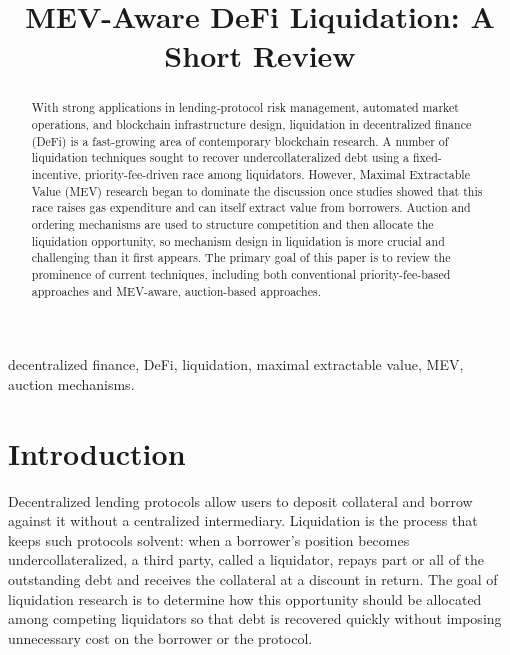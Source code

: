 \documentclass[conference]{IEEEtran}
\begin{document}
\title{MEV-Aware DeFi Liquidation: A Short Review}

\author{
}

\maketitle

\begin{abstract}
With strong applications in lending-protocol risk management, automated
market operations, and blockchain infrastructure design, liquidation in
decentralized finance (DeFi) is a fast-growing area of contemporary
blockchain research. A number of liquidation techniques sought to recover
undercollateralized debt using a fixed-incentive, priority-fee-driven
race among liquidators. However, Maximal Extractable Value (MEV)
research began to dominate the discussion once studies showed that this
race raises gas expenditure and can itself extract value from borrowers.
Auction and ordering mechanisms are used to structure competition and
then allocate the liquidation opportunity, so mechanism design in
liquidation is more crucial and challenging than it first appears. The
primary goal of this paper is to review the prominence of current
techniques, including both conventional priority-fee-based approaches
and MEV-aware, auction-based approaches.
\end{abstract}

\begin{IEEEkeywords}
decentralized finance, DeFi, liquidation, maximal extractable value, MEV, auction mechanisms.
\end{IEEEkeywords}

\section{Introduction}

Decentralized lending protocols allow users to deposit collateral and
borrow against it without a centralized intermediary. Liquidation is the
process that keeps such protocols solvent: when a borrower's position
becomes undercollateralized, a third party, called a liquidator, repays
part or all of the outstanding debt and receives the collateral at a
discount in return. The goal of liquidation research is to determine how
this opportunity should be allocated among competing liquidators so that
debt is recovered quickly without imposing unnecessary cost on the
borrower or the protocol.
\end{document}
